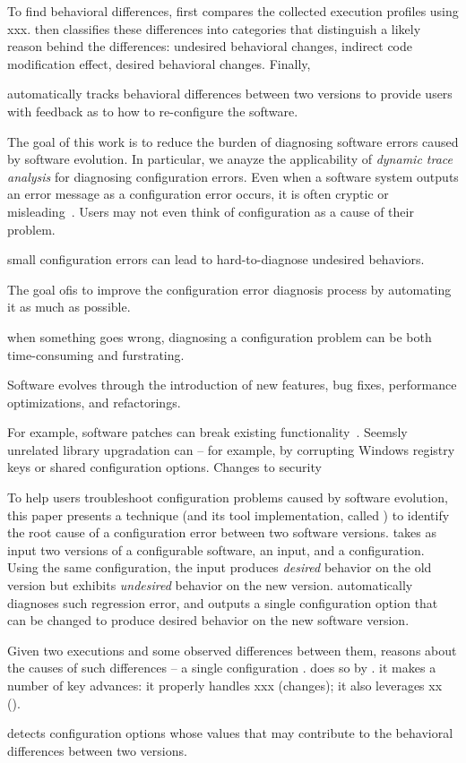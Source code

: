 To find behavioral differences, \ourtool first compares the collected
execution profiles using xxx. \ourtool then classifies these
differences into categories that distinguish a likely
reason behind the differences: undesired behavioral changes,
indirect code modification effect,
desired behavioral changes. Finally, 


\ourtool automatically tracks behavioral differences between two
versions to provide users with feedback as to how to re-configure
the software.


The goal of this work is to reduce the burden
of diagnosing software errors caused by software evolution. 
In particular, we anayze the applicability of
\textit{dynamic trace analysis} for diagnosing configuration
errors.
Even when a software system outputs an error message
as a configuration error occurs,
it is often cryptic or misleading~\cite{}. Users may not
even think of configuration as a cause of their problem.

small configuration errors can lead to hard-to-diagnose
undesired behaviors. 

The goal of\ourtool is to improve the configuration error diagnosis
process by automating it as much as possible.

when something goes wrong,
diagnosing a configuration problem can be both
time-consuming and furstrating.

Software evolves through the introduction of new features, bug fixes,
performance optimizations, and refactorings. 

For example, software
patches can break existing functionality~\cite{}.
Seemsly unrelated library upgradation can
 -- for example, by corrupting Windows
registry keys or shared configuration options.
Changes to security  



To help users troubleshoot configuration problems caused
by software evolution, this paper presents
a technique (and its tool implementation, called
\ourtool) to identify the root cause of a configuration
error between two software versions.  \ourtool takes as input
two versions of a configurable software,
an input, and a configuration. Using the same configuration,
the input produces \textit{desired} behavior
on the old version but exhibits \textit{undesired} behavior on the new version.
\ourtool automatically diagnoses such regression
error, and outputs a single configuration option
that can be changed to produce desired behavior on the
new software version.

 Given two executions and some observed differences between them,
\ourtool reasons about the causes of such differences -- a single configuration
. \ourtool does so by . it makes a number
of key advances: it properly handles xxx (changes); it also leverages
xx ().

 \ourtool detects configuration options whose values
that may contribute to the behavioral differences
between two versions.

